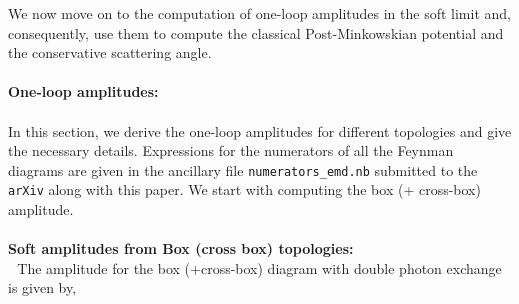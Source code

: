 \noindent
We now move on to the computation of one-loop amplitudes in the soft limit and, consequently, use them to compute the classical Post-Minkowskian potential and the conservative scattering angle. \\\\
\textbf{One-loop amplitudes: }\\\\
In this section, we derive the one-loop amplitudes for different topologies and give the necessary details.  Expressions for the numerators of all the Feynman diagrams are given in the ancillary file \texttt{numerators\_emd.nb} submitted to the \texttt{arXiv} along with this paper. 
We start with computing the box (+ cross-box) amplitude.\\\\
\textbf{Soft amplitudes from Box (cross box) topologies:}\\
\textbullet $\,\,$ The amplitude for the box (+cross-box) diagram with double photon exchange is given by,

